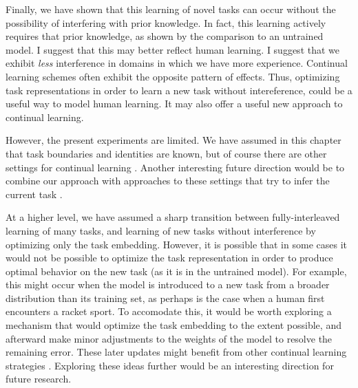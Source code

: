 Finally, we have shown that this learning of novel tasks can occur without the possibility of interfering with prior knowledge. In fact, this learning actively requires that prior knowledge, as shown by the comparison to an untrained model. I suggest that this may better reflect human learning. I suggest that we exhibit \emph{less} interference in domains in which we have more experience. Continual learning schemes often exhibit the opposite pattern of effects. Thus, optimizing task representations in order to learn a new task without intereference, could be a useful way to model human learning. It may also offer a useful new approach to continual learning.\par 
However, the present experiments are limited. We have assumed in this chapter that task boundaries and identities are known, but of course there are other settings for continual learning \citep{Ven2018}. Another interesting future direction would be to combine our approach with approaches to these settings that try to infer the current task \citep[e.g][]{Nagabandi2019}. \par
At a higher level, we have assumed a sharp transition between fully-interleaved learning of many tasks, and learning of new tasks without interference by optimizing only the task embedding. However, it is possible that in some cases it would not be possible to optimize the task representation in order to produce optimal behavior on the new task (as it is in the untrained model). For example, this might occur when the model is introduced to a new task from a broader distribution than its training set, as perhaps is the case when a human first encounters a racket sport. To accomodate this, it would be worth exploring a mechanism that would optimize the task embedding to the extent possible, and afterward make minor adjustments to the weights of the model to resolve the remaining error. These later updates might benefit from other continual learning strategies \citep[e.g.][]{Kirckpatrick2016, Zenke2017}. Exploring these ideas further would be an interesting direction for future research.\par
